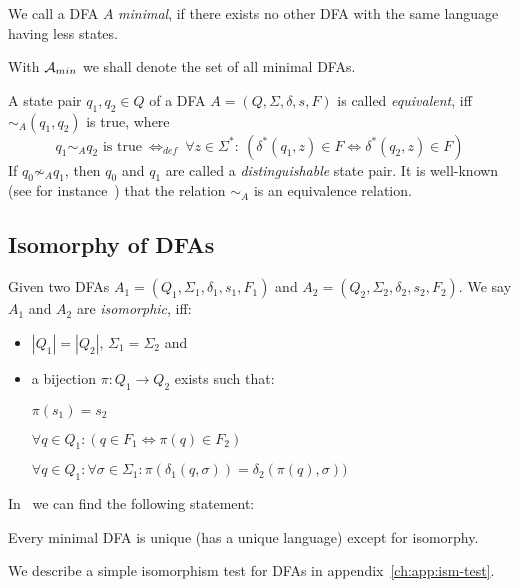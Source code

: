 \begin{definition}
	We call a DFA $A$ \emph{minimal}, if there exists no other DFA with the same language having less states.
\end{definition}
\noindent With ${\mathcal{A}_{min}}$ we shall denote the set of all minimal DFAs.

\begin{definition}\label{ch:2:def:eq-dist-pairs}
	A state pair $q_1, q_2 \in Q$ of a DFA $A = (Q, \Sigma, \delta, s, F)$ is called \emph{equivalent}, iff $\sim_A(q_1, q_2)$ is true, where
	\begin{displaymath}
	q_1 \sim_A q_2 \text{ is true}\ \Leftrightarrow_{def}\ \forall z \in \Sigma^* \colon\ (\delta^*(q_1, z) \in F \Leftrightarrow \delta^*(q_2, z) \in F)
	\end{displaymath}
	If $q_0 \not\sim_A q_1$, then $q_0$ and $q_1$ are called a \emph{distinguishable} state pair. It is well-known (see for instance~\cite[p. 160]{HMU01}) that the relation $\sim_A$ is an equivalence relation.
\end{definition}

\subsection{Isomorphy of DFAs}\label{ch:2:sec:isom}

Given two DFAs $A_1 = (Q_1, \Sigma_1, \delta_1, s_1, F_1)$ and $A_2 = (Q_2, \Sigma_2, \delta_2, s_2, F_2)$. We say $A_1$ and $A_2$ are \emph{isomorphic}, iff:
\begin{itemize}
	\item $|Q_1| = |Q_2|$, $\Sigma_1 = \Sigma_2$ and
	\item a bijection $\pi\colon Q_1 \to Q_2$ exists such that:
	
	$\pi(s_1) = s_2$
	
	$\forall q\in Q_1\colon (q\in F_1 \Longleftrightarrow \pi(q)\in F_2)$
	
	$\forall q\in Q_1\colon \forall\sigma\in\Sigma_1\colon \pi(\delta_1(q,\sigma))=\delta_2(\pi(q),\sigma))$
\end{itemize}
In~\cite[p. 45]{Sch01} we can find the following statement:
\begin{theorem}\label{ch:2:thm:uniq-ism}
	Every minimal DFA is unique (has a unique language) except for isomorphy.
\end{theorem}
\noindent We describe a simple isomorphism test for DFAs in appendix~\ref{ch:app:ism-test}.

